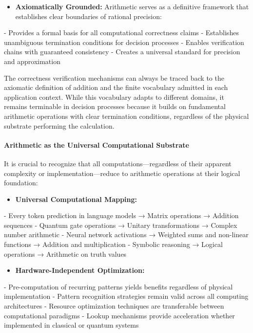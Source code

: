 \begin{itemize}
\item \textbf{Axiomatically Grounded:} Arithmetic serves as a definitive framework that establishes clear boundaries of rational precision:
\end{itemize}
  - Provides a formal basis for all computational correctness claims
  - Establishes unambiguous termination conditions for decision processes
  - Enables verification chains with guaranteed consistency
  - Creates a universal standard for precision and approximation

The correctness verification mechanisms can always be traced back to the axiomatic definition of addition and the finite vocabulary admitted in each application context. While this vocabulary adapts to different domains, it remains terminable in decision processes because it builds on fundamental arithmetic operations with clear termination conditions, regardless of the physical substrate performing the calculation.
\paragraph{Arithmetic as the Universal Computational Substrate}

It is crucial to recognize that all computations—regardless of their apparent complexity or implementation—reduce to arithmetic operations at their logical foundation:

\begin{itemize}
\item \textbf{Universal Computational Mapping:}
\end{itemize}
  - Every token prediction in language models → Matrix operations → Addition sequences
  - Quantum gate operations → Unitary transformations → Complex number arithmetic
  - Neural network activations → Weighted sums and non-linear functions → Addition and multiplication
  - Symbolic reasoning → Logical operations → Arithmetic on truth values

\begin{itemize}
\item \textbf{Hardware-Independent Optimization:}
\end{itemize}
  - Pre-computation of recurring patterns yields benefits regardless of physical implementation
  - Pattern recognition strategies remain valid across all computing architectures
  - Resource optimization techniques are transferable between computational paradigms
  - Lookup mechanisms provide acceleration whether implemented in classical or quantum systems

